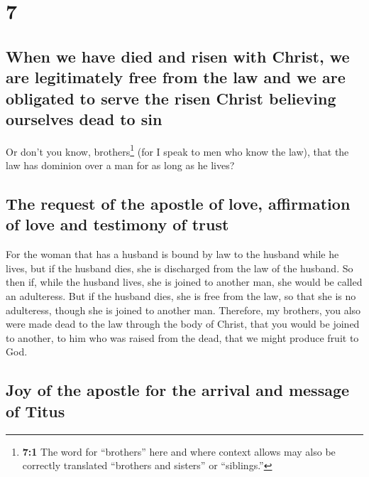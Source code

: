 \hypertarget{section-6}{%
\section{7}\label{section-6}}

\hypertarget{when-we-have-died-and-risen-with-christ-we-are-legitimately-free-from-the-law-and-we-are-obligated-to-serve-the-risen-christ-believing-ourselves-dead-to-sin}{%
\subsection{When we have died and risen with Christ, we are legitimately
free from the law and we are obligated to serve the risen Christ
believing ourselves dead to
sin}\label{when-we-have-died-and-risen-with-christ-we-are-legitimately-free-from-the-law-and-we-are-obligated-to-serve-the-risen-christ-believing-ourselves-dead-to-sin}}

 Or don't you know, brothers\footnote{\textbf{7:1} The
  word for ``brothers'' here and where context allows may also be
  correctly translated ``brothers and sisters'' or ``siblings.''} (for I
speak to men who know the law), that the law has dominion over a man for
as long as he lives?

\hypertarget{the-request-of-the-apostle-of-love-affirmation-of-love-and-testimony-of-trust}{%
\subsection{The request of the apostle of love, affirmation of love and
testimony of
trust}\label{the-request-of-the-apostle-of-love-affirmation-of-love-and-testimony-of-trust}}

 For the woman that has a husband is bound by law to the
husband while he lives, but if the husband dies, she is discharged from
the law of the husband.  So then if, while the husband
lives, she is joined to another man, she would be called an adulteress.
But if the husband dies, she is free from the law, so that she is no
adulteress, though she is joined to another man. 
Therefore, my brothers, you also were made dead to the law through the
body of Christ, that you would be joined to another, to him who was
raised from the dead, that we might produce fruit to God.

\hypertarget{joy-of-the-apostle-for-the-arrival-and-message-of-titus}{%
\subsection{Joy of the apostle for the arrival and message of
Titus}\label{joy-of-the-apostle-for-the-arrival-and-message-of-titus}}

